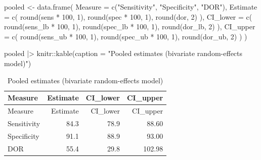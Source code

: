 \documentclass[
  letterpaper,
  DIV=11,
  numbers=noendperiod]{scrartcl}
\newenvironment{Shaded}{\begin{snugshade}}{\end{snugshade}}
\newcommand{\AttributeTok}[1]{\textcolor[rgb]{0.40,0.45,0.13}{#1}}
\newcommand{\DecValTok}[1]{\textcolor[rgb]{0.68,0.00,0.00}{#1}}
\newcommand{\FunctionTok}[1]{\textcolor[rgb]{0.28,0.35,0.67}{#1}}
\newcommand{\NormalTok}[1]{\textcolor[rgb]{0.00,0.23,0.31}{#1}}
\newcommand{\OtherTok}[1]{\textcolor[rgb]{0.00,0.23,0.31}{#1}}
\newcommand{\SpecialCharTok}[1]{\textcolor[rgb]{0.37,0.37,0.37}{#1}}
\newcommand{\StringTok}[1]{\textcolor[rgb]{0.13,0.47,0.30}{#1}}
\begin{document}
\begin{Shaded}
\begin{Highlighting}[]
\NormalTok{pooled }\OtherTok{\textless{}{-}} \FunctionTok{data.frame}\NormalTok{(}
  \AttributeTok{Measure =} \FunctionTok{c}\NormalTok{(}\StringTok{"Sensitivity"}\NormalTok{, }\StringTok{"Specificity"}\NormalTok{, }\StringTok{"DOR"}\NormalTok{),}
  \AttributeTok{Estimate =} \FunctionTok{c}\NormalTok{(}
    \FunctionTok{round}\NormalTok{(sens }\SpecialCharTok{*} \DecValTok{100}\NormalTok{, }\DecValTok{1}\NormalTok{),}
    \FunctionTok{round}\NormalTok{(spec }\SpecialCharTok{*} \DecValTok{100}\NormalTok{, }\DecValTok{1}\NormalTok{),}
    \FunctionTok{round}\NormalTok{(dor, }\DecValTok{2}\NormalTok{)}
\NormalTok{  ),}
  \AttributeTok{CI\_lower =} \FunctionTok{c}\NormalTok{(}
    \FunctionTok{round}\NormalTok{(sens\_lb }\SpecialCharTok{*} \DecValTok{100}\NormalTok{, }\DecValTok{1}\NormalTok{),}
    \FunctionTok{round}\NormalTok{(spec\_lb }\SpecialCharTok{*} \DecValTok{100}\NormalTok{, }\DecValTok{1}\NormalTok{),}
    \FunctionTok{round}\NormalTok{(dor\_lb, }\DecValTok{2}\NormalTok{)}
\NormalTok{  ),}
  \AttributeTok{CI\_upper =} \FunctionTok{c}\NormalTok{(}
    \FunctionTok{round}\NormalTok{(sens\_ub }\SpecialCharTok{*} \DecValTok{100}\NormalTok{, }\DecValTok{1}\NormalTok{),}
    \FunctionTok{round}\NormalTok{(spec\_ub }\SpecialCharTok{*} \DecValTok{100}\NormalTok{, }\DecValTok{1}\NormalTok{),}
    \FunctionTok{round}\NormalTok{(dor\_ub, }\DecValTok{2}\NormalTok{)}
\NormalTok{  )}
\NormalTok{)}

\NormalTok{pooled }\SpecialCharTok{|\textgreater{}}
\NormalTok{  knitr}\SpecialCharTok{::}\FunctionTok{kable}\NormalTok{(}\AttributeTok{caption =} \StringTok{"Pooled estimates (bivariate random{-}effects model)"}\NormalTok{)}
\end{Highlighting}
\end{Shaded}

\begin{longtable}[]{@{}lrrr@{}}
\caption{Pooled estimates (bivariate random-effects
model)}\tabularnewline
\toprule\noalign{}
Measure & Estimate & CI\_lower & CI\_upper \\
\midrule\noalign{}
\endfirsthead
\toprule\noalign{}
Measure & Estimate & CI\_lower & CI\_upper \\
\midrule\noalign{}
\endhead
\bottomrule\noalign{}
\endlastfoot
Sensitivity & 84.3 & 78.9 & 88.60 \\
Specificity & 91.1 & 88.9 & 93.00 \\
DOR & 55.4 & 29.8 & 102.98 \\
\end{longtable}
\end{document}
